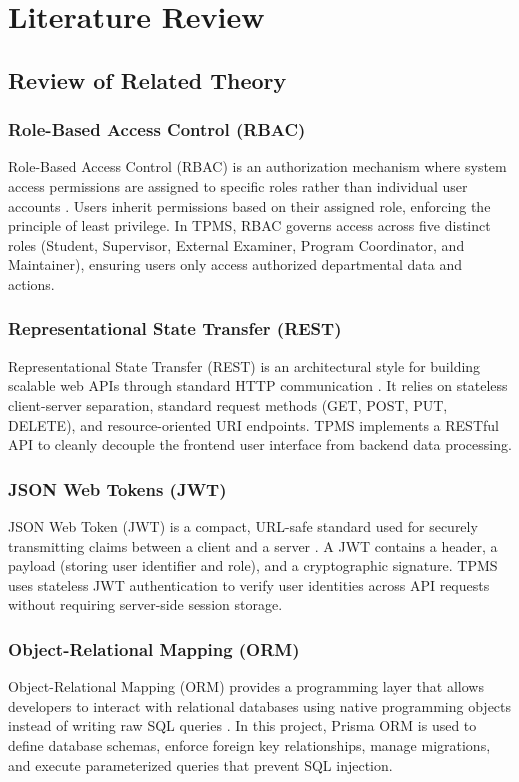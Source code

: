 \chapter{Literature Review}

\section{Review of Related Theory}

\subsection{Role-Based Access Control (RBAC)}
Role-Based Access Control (RBAC) is an authorization mechanism where system access permissions are assigned to specific roles rather than individual user accounts \cite{ferraiolo2007rbac}. Users inherit permissions based on their assigned role, enforcing the principle of least privilege. In TPMS, RBAC governs access across five distinct roles (Student, Supervisor, External Examiner, Program Coordinator, and Maintainer), ensuring users only access authorized departmental data and actions.

\subsection{Representational State Transfer (REST)}
Representational State Transfer (REST) is an architectural style for building scalable web APIs through standard HTTP communication \cite{fielding2000architectural}. It relies on stateless client-server separation, standard request methods (GET, POST, PUT, DELETE), and resource-oriented URI endpoints. TPMS implements a RESTful API to cleanly decouple the frontend user interface from backend data processing.

\subsection{JSON Web Tokens (JWT)}
JSON Web Token (JWT) is a compact, URL-safe standard used for securely transmitting claims between a client and a server \cite{jones2015jwt}. A JWT contains a header, a payload (storing user identifier and role), and a cryptographic signature. TPMS uses stateless JWT authentication to verify user identities across API requests without requiring server-side session storage.

\subsection{Object-Relational Mapping (ORM)}
Object-Relational Mapping (ORM) provides a programming layer that allows developers to interact with relational databases using native programming objects instead of writing raw SQL queries \cite{prisma2024orm}. In this project, Prisma ORM is used to define database schemas, enforce foreign key relationships, manage migrations, and execute parameterized queries that prevent SQL injection.

